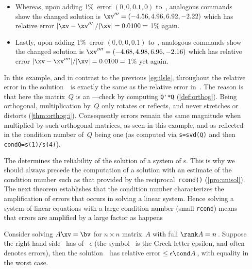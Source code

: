 \begin{example}
\begin{solution}
\begin{itemize}
\item Whereas, upon adding 1\%~error \((0,0,0.1,0)\) to~\bv, analogous commands show the changed solution is \(\xv'''=(-4.56,4.96,6.92,-2.22)\) which has relative error \(|\xv-\xv'''|/|\xv|=0.0100={}\)1\% again.

\item Lastly, upon adding 1\%~error \((0,0,0,0.1)\) to~\bv, analogous commands show the changed solution is \(\xv''''=(-4.68,4.98,6.96,-2.16)\) which has relative error \(|\xv-\xv''''|/|\xv|=0.0100={}\)1\% yet again.

\end{itemize}
In this example, and in contrast to the previous \cref{eg:ilsle}, throughout the relative error in the solution~\xv\ is exactly the same as the relative error in~\bv.
The reason is that here the matrix~\(Q\) is an ---check by computing \verb|Q'*Q| (\cref{def:orthog}).
Being orthogonal, multiplication by~\(Q\) only rotates or reflects, and never stretches or distorts (\cref{thm:orthog:i}).
Consequently errors remain the same magnitude when multiplied by such orthogonal matrices, as seen in this example, and as reflected in the condition number of~\(Q\) being one (as computed via \verb|s=svd(Q)| and then \verb|condQ=s(1)/s(4)|).
\end{solution}
\end{example}





The  determines the reliability of the solution of a system of s.
This is why we should always precede the computation of a solution with an estimate of the condition number such as that provided by the reciprocal~\verb|rcond()| (\cref{pro:unisol}). 
The next theorem establishes that the condition number characterizes the amplification of errors that occurs in solving a linear system.
Hence solving a system of linear equations with a large condition number (small \verb|rcond|) means that errors are amplified by a large factor as happens 

\begin{theorem} \label{thm:erramp}
Consider solving \(A\xv=\bv\) for \(n\times n\) matrix~\(A\) with full \(\rank A=n\)\,.  
Suppose the right-hand side \bv~has  of ~\(\epsilon\) (the symbol~\idx{$\epsilon$} is the Greek letter epsilon, and often denotes errors),
then the solution~\xv\ has relative error\({}\leq\epsilon\cond A\)\,, with equality in the worst case.
\end{theorem}

